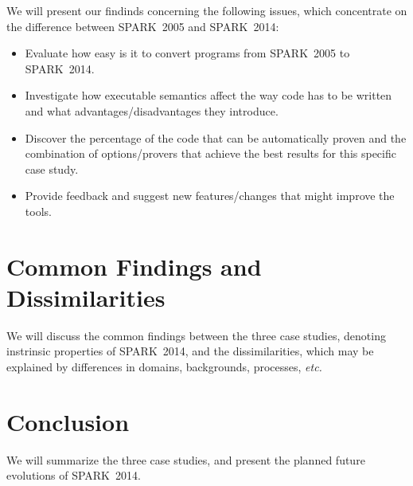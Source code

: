 \documentclass[10pt,a4paper,twocolumn]{article}
\newcommand{\oldspark}{SPARK~2005\xspace}
\newcommand{\newspark}{SPARK~2014\xspace}
\newcommand{\etc}{\textit{etc.}\xspace}
\begin{document}
We will present our findinds concerning the following issues, which concentrate
on the difference between \oldspark and \newspark:

\begin {itemize}
  \item Evaluate how easy is it to convert programs from \oldspark to \newspark.
  \item Investigate how executable semantics affect the way code has to be written
        and what advantages/disadvantages they introduce.
  \item Discover the percentage of the code that can be automatically proven
        and the combination of options/provers that achieve the best results
        for this specific case study.
  \item Provide feedback and suggest new features/changes that might improve the
    tools.
\end {itemize}

\section{Common Findings and Dissimilarities}

We will discuss the common findings between the three case studies, denoting
instrinsic properties of \newspark, and the dissimilarities, which may be
explained by differences in domains, backgrounds, processes, \etc

\section{Conclusion}

We will summarize the three case studies, and present the planned future
evolutions of \newspark.



\end{document}
